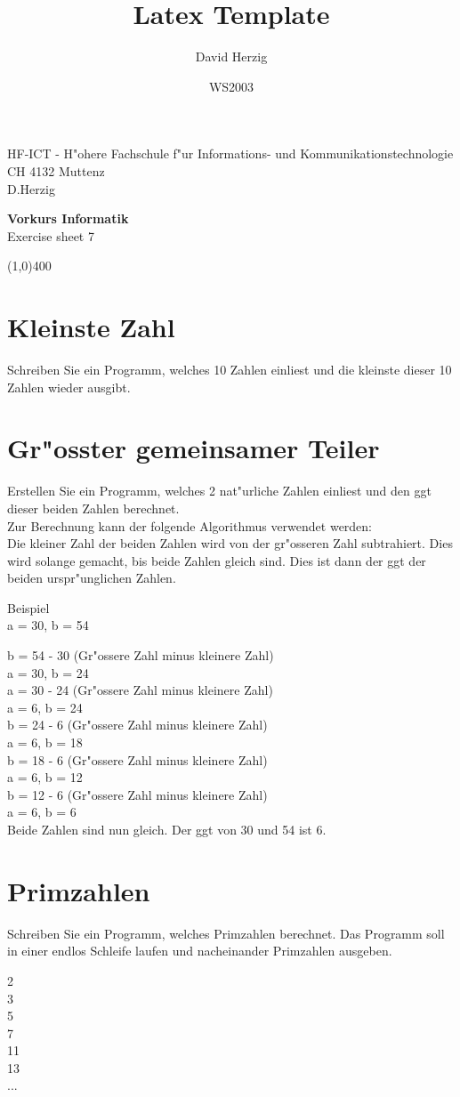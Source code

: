 \documentclass[a4paper,10pt]{article}
\title{Latex Template}
\author{David Herzig}
\date{WS2003}
\begin{document}
HF-ICT - H"ohere Fachschule f"ur Informations- und Kommunikationstechnologie\\
CH 4132 Muttenz\\
D.Herzig

\vspace{2mm}

\begin{center}
{\Large \bf Vorkurs Informatik}\\
Exercise sheet 7
\end{center}

\vspace{2mm}

\line(1,0){400}

\vspace{5mm}

\section{Kleinste Zahl}
Schreiben Sie ein Programm, welches 10 Zahlen einliest und die kleinste dieser 10 Zahlen wieder ausgibt.

\section{Gr"osster gemeinsamer Teiler}
Erstellen Sie ein Programm, welches 2 nat"urliche Zahlen einliest und den ggt dieser beiden Zahlen berechnet.\\
Zur Berechnung kann der folgende Algorithmus verwendet werden:\\
Die kleiner Zahl der beiden Zahlen wird von der gr"osseren Zahl subtrahiert. Dies wird solange gemacht,
bis beide Zahlen gleich sind. Dies ist dann der ggt der beiden urspr"unglichen Zahlen.

\vspace{3mm}
Beispiel\\
a = 30, b = 54

\vspace{3mm}
b = 54 - 30 (Gr"ossere Zahl minus kleinere Zahl)\\
a = 30, b = 24\\
a = 30 - 24 (Gr"ossere Zahl minus kleinere Zahl)\\
a = 6, b = 24\\
b = 24 - 6 (Gr"ossere Zahl minus kleinere Zahl)\\
a = 6, b = 18\\
b = 18 - 6 (Gr"ossere Zahl minus kleinere Zahl)\\
a = 6, b = 12\\
b = 12 - 6 (Gr"ossere Zahl minus kleinere Zahl)\\
a = 6, b = 6\\
Beide Zahlen sind nun gleich. Der ggt von 30 und 54 ist 6.

\section{Primzahlen}
Schreiben Sie ein Programm, welches Primzahlen berechnet. Das Programm soll in einer endlos Schleife laufen
und nacheinander Primzahlen ausgeben.

\vspace{5mm}
2\\
3\\
5\\
7\\
11\\
13\\
...
\end{document}
